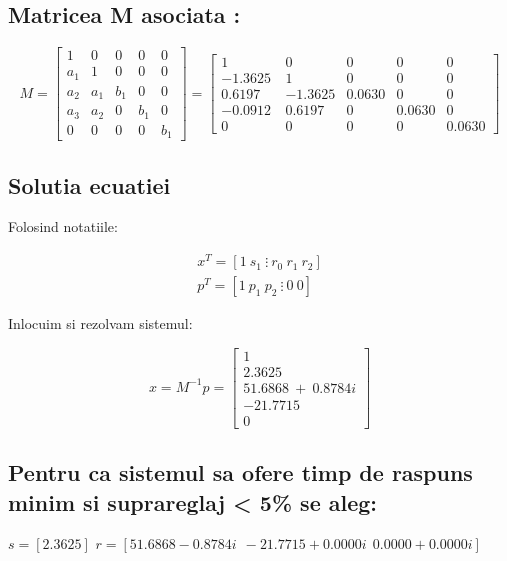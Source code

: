 \documentclass[12pt,english]{article}
\begin{document}
\subsection {Matricea M asociata : }
\begin{center}
  \begin{equation*}
  M=\begin{bmatrix}
  1 & 0 & 0 & 0 & 0\\
  a_{1} & 1 & 0 & 0 & 0\\
  a_{2} & a_{1} & b_{1} & 0 & 0\\
  a_{3} & a_{2} & 0 & b_{1} & 0\\
  0 & 0 & 0 & 0 & b_{1}
  \end{bmatrix} =\begin{bmatrix}
  1 & 0 & 0 & 0 & 0\\
  -1.3625\  & 1 & 0 & 0 & 0\\
  0.6197 & -1.3625 & 0.0630 & 0 & 0\\
  -0.0912 & 0.6197 & 0 & 0.0630 & 0\\
  0 & 0 & 0 & 0 & 0.0630
  \end{bmatrix}
  \end{equation*}
\end{center}

\subsection {Solutia ecuatiei}
Folosind notatiile:
\begin{center}
  \begin{gather*}
  x^{T} =[ 1\ s_{1} \ \vdots \ r_{0} \ r_{1} \ r_{2}]\\
  p^{T} =[ 1\ p_{1} \ p_{2} \ \vdots \ 0 \ 0]
  \end{gather*}
\end{center}

Inlocuim si rezolvam sistemul:
\begin{center}
  \begin{equation*}
  x=M^{-1} p=\begin{bmatrix}
  1\\
  2.3625\\
  51.6868\ +\ 0.8784i\\
  -21.7715\ \\
  0
  \end{bmatrix}
  \end{equation*}
\end{center}

\subsection {Pentru ca sistemul sa ofere timp de raspuns minim si suprareglaj < 5\% se aleg:}
$s = [2.3625]$
$r = [51.6868 - 0.8784i\ \ -21.7715 + 0.0000i\ \ 0.0000 + 0.0000i]$
\end{document}
